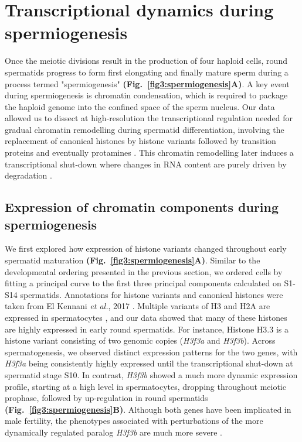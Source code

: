 \section{Transcriptional dynamics during spermiogenesis}
\label{sec3:spermiogenesis}

Once the meiotic divisions result in the production of four haploid cells, round spermatids progress to form first elongating and finally mature sperm during a process termed "spermiogenesis" \textbf{(Fig.~\ref{fig3:spermiogenesis}A)}. 
A key event during spermiogenesis is chromatin condensation, which is required to package the haploid genome into the confined space of the sperm nucleus. 
Our data allowed us to dissect at high-resolution the transcriptional regulation needed for gradual chromatin remodelling during spermatid differentiation, involving the replacement of canonical histones by histone variants followed by transition proteins and eventually protamines \citep{Balhorn2007, Kennani2017}. 
This chromatin remodelling later induces a transcriptional shut-down where changes in RNA content are purely driven by degradation \citep{Steger1999}.

\subsection{Expression of chromatin components during spermiogenesis}

We first explored how expression of histone variants changed throughout early spermatid maturation \textbf{(Fig.~\ref{fig3:spermiogenesis}A)}. 
Similar to the developmental ordering presented in the previous section, we ordered cells by fitting a principal curve to the first three principal components calculated on S1-S14 spermatids. 
Annotations for histone variants and canonical histones were taken from El Kennani \emph{et al.}, 2017 \citep{Kennani2017}. 
Multiple variants of H3 and H2A are expressed in spermatocytes \citep{Greaves2006, Mahadevaiah2001, Tang2015}, and our data showed that many of these histones are highly expressed in early round spermatids. For instance, Histone H3.3 is a histone variant consisting of two genomic copies (\textit{H3f3a} and \textit{H3f3b}). 
Across spermatogenesis, we observed distinct expression patterns for the two genes, with \textit{H3f3a} being consistently highly expressed until the transcriptional shut-down at spermatid stage S10. 
In contrast, \textit{H3f3b} showed a much more dynamic expression profile, starting at a high level in spermatocytes, dropping throughout meiotic prophase, followed by up-regulation in round spermatids \textbf{(Fig.~\ref{fig3:spermiogenesis}B)}. 
Although both genes have been implicated in male fertility, the phenotypes associated with perturbations of the more dynamically regulated paralog \textit{H3f3b} are much more severe \citep{Tang2015, Yuen2014}.\\

